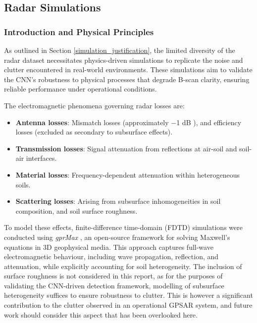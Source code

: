 \subsection{Radar Simulations} \label{compvis_radarsims}

    \subsubsection{Introduction and Physical Principles} \label{rory_radar_principles}
        As outlined in Section \ref{simulation_justification}, the limited diversity of the radar dataset necessitates physics-driven simulations to replicate the noise and clutter encountered in real-world environments. These simulations aim to validate the CNN’s robustness to physical processes that degrade B-scan clarity, ensuring reliable performance under operational conditions.
    
    The electromagnetic phenomena governing radar losses are:
    \begin{itemize}
    
        \item \textbf{Antenna losses}: Mismatch losses (approximately −1 dB \cite{daniels2005gpr}), and efficiency losses (excluded as secondary to subsurface effects).
        
        \item \textbf{Transmission losses}: Signal attenuation from reflections at air-soil and soil-air interfaces.
        
        \item \textbf{Material losses}: Frequency-dependent attenuation within heterogeneous soils.
        
        \item \textbf{Scattering losses}: Arising from subsurface inhomogeneities in soil composition, and soil surface roughness.
    
    \end{itemize}
    
    To model these effects, finite-difference time-domain (FDTD) simulations were conducted using \textit{gprMax} \cite{warren2016gprmax}, an open-source framework for solving Maxwell’s equations in 3D geophysical media. This approach captures full-wave electromagnetic behaviour, including wave propagation, reflection, and attenuation, while explicitly accounting for soil heterogeneity. The inclusion of surface roughness is not considered in this report, as for the purposes of validating the CNN-driven detection framework, modelling of subsurface heterogeneity suffices to ensure robustness to clutter. This is however a significant contribution to the clutter observed in an operational GPSAR system, and future work should consider this aspect that has been overlooked here.
 
